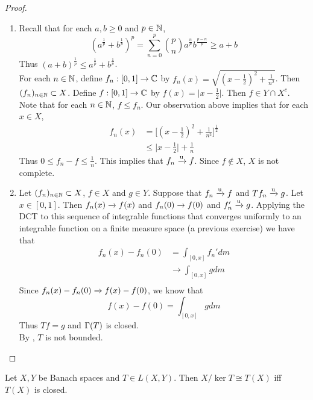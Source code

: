 \documentclass{book}
\begin{document}
	\begin{proof}
		\begin{enumerate}
			\item Recall that for each $a,b \geq 0$ and $p \in \mathbb{N}$, $$(a^{\frac{1}{p}}+b^{\frac{1}{p}})^p = \sum_{n=0}^p  {p \choose n} a^{\frac{n}{p}}b^{\frac{p-n}{p}} \geq a + b$$ Thus $(a+b)^{\frac{1}{p}} \leq a^{\frac{1}{p}}+b^{\frac{1}{p}}$.\\
			For each $n \in \mathbb{N}$, define $f_n: [0,1] \rightarrow \mathbb{C}$ by $f_n(x) = \sqrt{(x-\frac{1}{2})^2+ \frac{1}{n^2}}$. Then $(f_n)_{n \in \mathbb{N}} \subset X$. Define $f:[0,1] \rightarrow \mathbb{C}$ by $f(x) = \vert x-\frac{1}{2}\vert$. Then $f \in Y \cap X^c$. Note that for each $n \in \mathbb{N}$, $f \leq f_n$. Our observation above implies that for each $x \in X$,
			\begin{align*}
				f_n(x) 
				&= \bigg[ (x-\frac{1}{2})^2 + \frac{1}{n^2} \bigg]^{\frac{1}{2}}\\
				& \leq \vert x-\frac{1}{2} \vert + \frac{1}{n}
			\end{align*}
			Thus $0 \leq f_n - f \leq \frac{1}{n} $. This implies that $f_n \xrightarrow{\text{u}} f$. Since $f \not \in X$, $X$ is not complete. \vspace{.5cm}\\
			\item Let $(f_n)_{n \in \mathbb{N}} \subset X$, $f \in X$ and $g \in Y$. Suppose that $f_n \xrightarrow{\text{u}} f$ and $Tf_n \xrightarrow{\text{u}} g$. Let $x \in [0,1]$. Then $f_n(x) \xrightarrow{} f(x)$ and $f_n(0) \xrightarrow{} f(0)$ and $f_n' \xrightarrow{\text{u}} g$. Applying the DCT to this sequence of integrable functions that converges uniformly to an integrable function on a finite measure space (a previous exercise) we have that
			\begin{align*}
				f_n(x) - f_n(0) 
				&= \int_{[0,x]} f_n' dm \\
				& \rightarrow \int_{[0,x]} g dm \\ 
			\end{align*} 
			Since $f_n(x) - f_n(0) \xrightarrow{} f(x) - f(0)$, we know that $$f(x) - f(0) = \int_{[0,x]} g dm$$ Thus $Tf = g$ and $\Gamma(T)$ is closed. \\
			By , $T$ is not bounded.
		\end{enumerate}
	\end{proof}
	
	\begin{ex} \lex{}
		Let $X, Y$ be Banach spaces and $T \in L(X,Y)$. Then $X/\ker T \cong T(X)$ iff $T(X)$ is closed.
	\end{ex}
	
\end{document}
